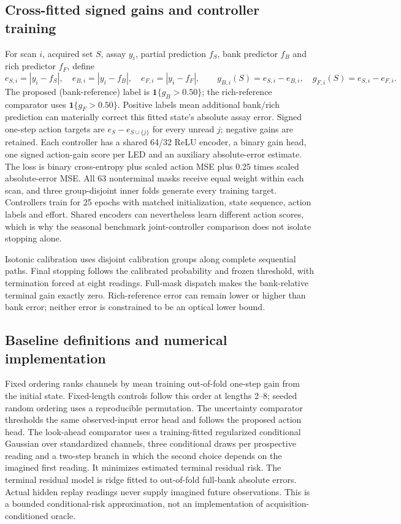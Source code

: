 \documentclass[10pt,a4paper]{article}
\begin{document}
\subsection{Cross-fitted signed gains and controller training}
For scan $i$, acquired set $S$, assay $y_i$, partial prediction $f_S$, bank predictor $f_B$ and rich predictor $f_F$, define
\[
 e_{S,i}=|y_i-f_S|,\quad e_{B,i}=|y_i-f_B|,\quad e_{F,i}=|y_i-f_F|,\qquad
 g_{B,i}(S)=e_{S,i}-e_{B,i},\quad g_{F,i}(S)=e_{S,i}-e_{F,i}.
\]
The proposed (bank-reference) label is $\mathbf{1}\{g_B>0.50\}$; the rich-reference comparator uses $\mathbf{1}\{g_F>0.50\}$. Positive labels mean additional bank/rich prediction can materially correct this fitted state's absolute assay error. Signed one-step action targets are $e_S-e_{S\cup\{j\}}$ for every unread $j$; negative gains are retained. Each controller has a shared 64/32 ReLU encoder, a binary gain head, one signed action-gain score per LED and an auxiliary absolute-error estimate. The loss is binary cross-entropy plus scaled action MSE plus 0.25 times scaled absolute-error MSE. All 63 nonterminal masks receive equal weight within each scan, and three group-disjoint inner folds generate every training target. Controllers train for 25 epochs with matched initialization, state sequence, action labels and effort. Shared encoders can nevertheless learn different action scores, which is why the seasonal benchmark joint-controller comparison does not isolate stopping alone.

Isotonic calibration uses disjoint calibration groups along complete sequential paths. Final stopping follows the calibrated probability and frozen threshold, with termination forced at eight readings. Full-mask dispatch makes the bank-relative terminal gain exactly zero. Rich-reference error can remain lower or higher than bank error; neither error is constrained to be an optical lower bound.

\subsection{Baseline definitions and numerical implementation}
Fixed ordering ranks channels by mean training out-of-fold one-step gain from the initial state. Fixed-length controls follow this order at lengths 2--8; seeded random ordering uses a reproducible permutation. The uncertainty comparator thresholds the same observed-input error head and follows the proposed action head. The look-ahead comparator uses a training-fitted regularized conditional Gaussian over standardized channels, three conditional draws per prospective reading and a two-step branch in which the second choice depends on the imagined first reading. It minimizes estimated terminal residual risk. The terminal residual model is ridge fitted to out-of-fold full-bank absolute errors. Actual hidden replay readings never supply imagined future observations. This is a bounded conditional-risk approximation, not an implementation of acquisition-conditioned oracle.\citep{valancius2024}
\end{document}
